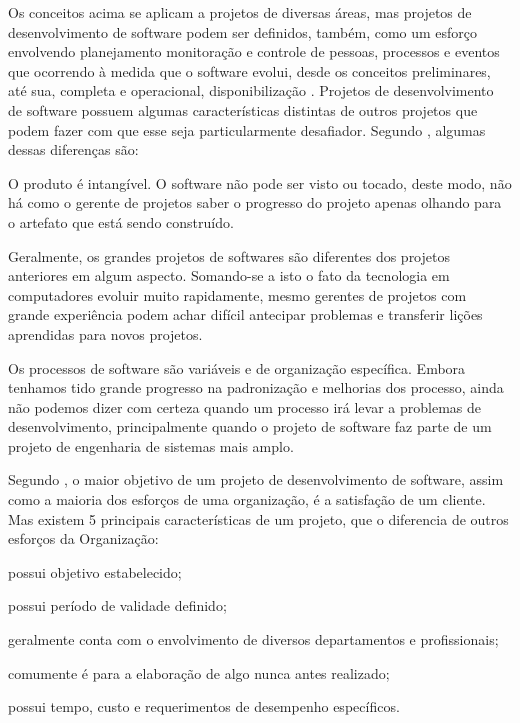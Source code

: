 \documentclass[
    12pt,               %
    openright,          %
    twoside,            %
    a4paper,            %
    chapter=TITLE,     %
    english,            %
    spanish,            %
    portuguese              %
    ]{abntex2}
\begin{document}
Os conceitos acima se aplicam a projetos de diversas áreas, mas projetos de desenvolvimento de software podem ser definidos, também, como um esforço envolvendo planejamento monitoração e controle de pessoas, processos e eventos que ocorrendo à medida que o software evolui, desde os conceitos preliminares, até sua, completa e operacional, disponibilização \cite{pressman2011}. Projetos de desenvolvimento de software possuem algumas características distintas de outros projetos que podem fazer com que esse seja particularmente desafiador. Segundo , algumas dessas diferenças são:

\begin{alineas}
	\item O produto é intangível. O software não pode ser visto ou tocado, deste modo, não há como o gerente de projetos saber o progresso do projeto apenas olhando para o artefato que está sendo construído.
	\item Geralmente, os grandes projetos de softwares são diferentes dos projetos anteriores em algum aspecto. Somando-se a isto o fato da tecnologia em computadores evoluir muito rapidamente, mesmo gerentes de projetos com grande experiência podem achar difícil antecipar problemas e transferir lições aprendidas para novos projetos.
	\item Os processos de software são variáveis e de organização específica. Embora tenhamos tido grande progresso na padronização e melhorias dos processo, ainda não podemos dizer com certeza quando um processo irá levar a problemas de desenvolvimento, principalmente quando o projeto de software faz parte de um projeto de engenharia de sistemas mais amplo.
\end{alineas}

Segundo , o maior objetivo de um projeto de desenvolvimento de software, assim como a maioria dos esforços de uma organização, é a satisfação de um cliente. Mas existem 5 principais características de um projeto, que o diferencia de outros esforços da Organização: 

\begin{alineas}
	\item possui objetivo estabelecido;
	\item possui período de validade definido;
	\item geralmente conta com o envolvimento de diversos departamentos e profissionais;
	\item comumente é para a elaboração de algo nunca antes realizado;
	\item possui tempo, custo e requerimentos de desempenho específicos.
\end{alineas}
\end{document}
